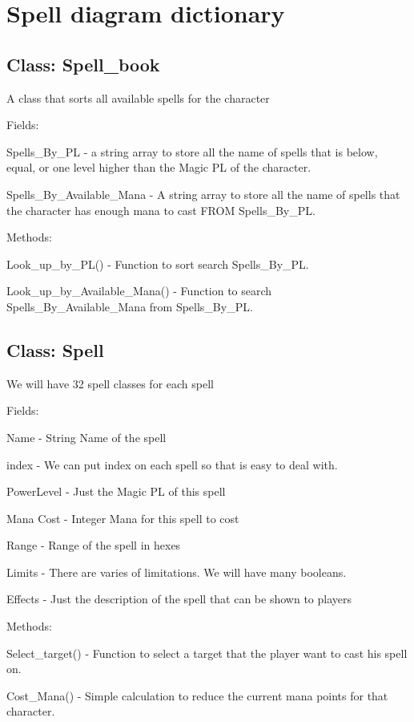 \section*{Spell diagram dictionary}
\subsection*{Class: Spell\_book}
A class that sorts all available spells for the character
\begin{al}
	\item[Fields:] \parbox{\textwidth}{Spells\_By\_PL - a string array to store all the name of spells that is below, equal, or one level higher than the Magic PL of the character.}
	\item[] \parbox{\textwidth}{Spells\_By\_Available\_Mana - A string array to store all the name of spells that the character has enough mana to cast FROM Spells\_By\_PL.}
	\item[Methods:] 	\item[] \parbox{\textwidth}{Look\_up\_by\_PL() - Function to sort search Spells\_By\_PL.}
	\item[] \parbox{\textwidth}{Look\_up\_by\_Available\_Mana() - Function to search Spells\_By\_Available\_Mana from Spells\_By\_PL.}
\end{al}
\subsection*{Class: Spell}
We will have 32 spell classes for each spell
\begin{al}
	\item[Fields:] \parbox{\textwidth}{Name - String Name of the spell}
	\item[] \parbox{\textwidth}{index -	We can put index on each spell so that is easy to deal with.}
	\item[] \parbox{\textwidth}{PowerLevel - Just the Magic PL of this spell}
	\item[] \parbox{\textwidth}{Mana Cost - Integer Mana for this spell to cost}
	\item[] \parbox{\textwidth}{Range - Range of the spell in hexes}
	\item[] \parbox{\textwidth}{Limits - There are varies of limitations. We will have many booleans.}
	\item[] \parbox{\textwidth}{Effects - Just the description of the spell that can be shown to players}
	\item[Methods:] \parbox{\textwidth}{Select\_target() - Function to select a target that the player want to cast his spell on.}
	\item[] \parbox{\textwidth}{Cost\_Mana() - Simple calculation to reduce the current mana points for that character.}
\end{al}


